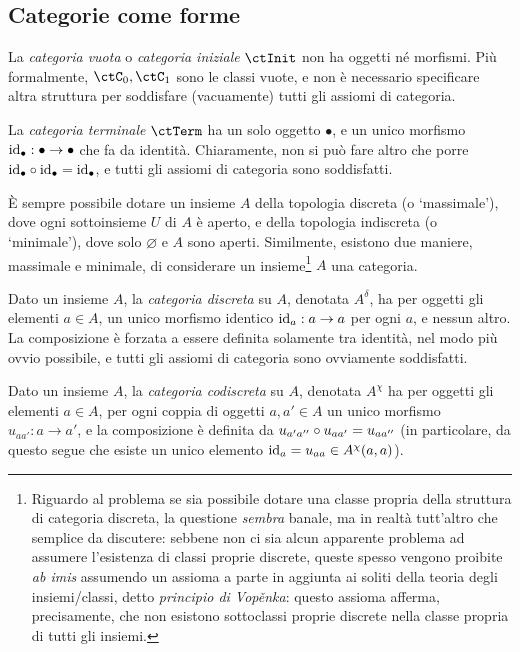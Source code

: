 \subsection{Categorie come forme}\label{ssec:categorie_forme}
\begin{example}\label{ex_cat_vuota}
	La \emph{categoria vuota} o \emph{categoria iniziale} \(\ctInit\) non ha oggetti né morfismi. Più formalmente, \(\ctC_0,\ctC_1\) sono le classi vuote, e non è necessario specificare altra struttura per soddisfare (vacuamente) tutti gli assiomi di categoria.
\end{example}
\begin{example}\label{ex_cat_term}
	La \emph{categoria terminale} \(\ctTerm\) ha un solo oggetto \(\bullet\), e un unico morfismo \(\mathrm{id}_\bullet : \bullet\to\bullet\) che fa da identità. Chiaramente, non si può fare altro che porre \(\mathrm{id}_\bullet\circ\mathrm{id}_\bullet=\mathrm{id}_\bullet\), e tutti gli assiomi di categoria sono soddisfatti.
\end{example}
\`E sempre possibile dotare un insieme \(A\) della topologia discreta (o `massimale'), dove ogni sottoinsieme \(U\) di \(A\) è aperto, e della topologia indiscreta (o `minimale'), dove solo \(\varnothing\) e \(A\) sono aperti. Similmente, esistono due maniere, massimale e minimale, di considerare un insieme\footnote{Riguardo al problema se sia possibile dotare una classe propria della struttura di categoria discreta, la questione \emph{sembra} banale, ma in realtà tutt'altro che semplice da discutere: sebbene non ci sia alcun apparente problema ad assumere l'esistenza di classi proprie discrete, queste spesso vengono proibite \emph{ab imis} assumendo un assioma a parte in aggiunta ai soliti della teoria degli insiemi/classi, detto \emph{principio di Vop\v enka}: questo assioma afferma, precisamente, che non esistono sottoclassi proprie discrete nella classe propria di tutti gli insiemi.} \(A\) una categoria.
\begin{example}\label{ex_cat_discreta}
	Dato un insieme \(A\), la \emph{categoria discreta} su \(A\), denotata \(A^\delta\), ha per oggetti gli elementi \(a\in A\), un unico morfismo identico \(\mathrm{id}_a : a\to a\) per ogni \(a\), e nessun altro. La composizione è forzata a essere definita solamente tra identità, nel modo più ovvio possibile, e tutti gli assiomi di categoria sono ovviamente soddisfatti.
\end{example}
\begin{example}\label{ex_cat_codiscreta}
	Dato un insieme \(A\), la \emph{categoria codiscreta} su \(A\), denotata \(A^\chi\) ha per oggetti gli elementi \(a\in A\), per ogni coppia di oggetti \(a,a'\in A\) un unico morfismo \(u_{aa'}:a\to a'\), e la composizione è definita da \(u_{a'a''}\circ u_{aa'}=u_{aa''}\) (in particolare, da questo segue che esiste un unico elemento \(\mathrm{id}_a=u_{aa}\in A^\chi(a,a)\)).
\end{example}

